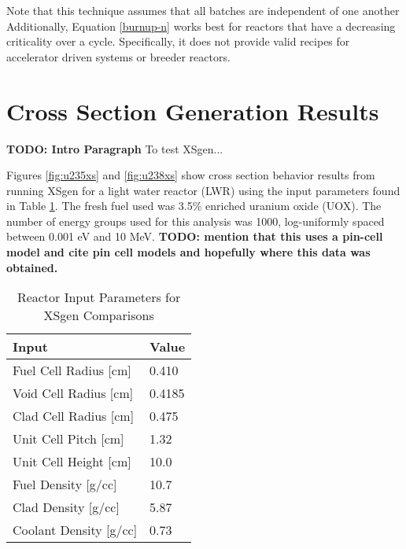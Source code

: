 \documentclass{article}
\newcommand{\TODO}[1] {{\color{red}\textbf{TODO: #1}}}
\begin{document}
Note that this technique assumes that all batches are independent of one another
Additionally, Equation \ref{burnup-n} works best for reactors that have a decreasing
criticality over a cycle. Specifically, it does not provide valid recipes for accelerator
driven systems or breeder reactors.

\section{Cross Section Generation Results}
\TODO{Intro Paragraph} To test XSgen...

Figures \ref{fig:u235xs} and \ref{fig:u238xs} show cross section behavior results
from running XSgen for a light water reactor (LWR) using the input parameters found in
Table \ref{tab:xsgenstats1}. The fresh fuel used was 3.5\% enriched uranium oxide (UOX).
The number of energy groups used for this analysis was 1000, log-uniformly spaced between
0.001 eV and 10 MeV. \TODO{mention that this uses a pin-cell model and cite pin cell models
and hopefully where this data was obtained.}

\begin{table}[!htb]
\centering
\caption{Reactor Input Parameters for XSgen Comparisons}
\label{tab:xsgenstats1}
\begin{tabular}{|ll|}
\hline
Input & Value \\
\hline
Fuel Cell Radius [cm] & 0.410 \\
Void Cell Radius [cm] & 0.4185 \\
Clad Cell Radius [cm] & 0.475 \\
Unit Cell Pitch  [cm] & 1.32 \\
Unit Cell Height [cm] & 10.0 \\
Fuel Density [g/cc] & 10.7 \\
Clad Density [g/cc] & 5.87 \\
Coolant Density [g/cc] & 0.73 \\
\hline
\end{tabular}
\end{table}
\end{document}

